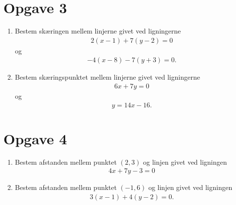 \section*{Opgave 3}
\begin{enumerate}[label=\roman*)]
	\item Bestem skæringen mellem linjerne givet ved ligningerne
	\begin{align*}
		2(x-1)+7(y-2) = 0
	\end{align*}
	og 
	\begin{align*}
		-4(x-8) -7(y+3) = 0.
	\end{align*}
	\item Bestem skæringspunktet mellem linjerne givet ved ligningerne
	\begin{align*}
		6x+7y=0
	\end{align*}
	og 
	\begin{align*}
		y = 14x-16.	
	\end{align*}
\end{enumerate}

\section*{Opgave 4}
\begin{enumerate}[label=\roman*)]
	\item Bestem afstanden mellem punktet $(2,3)$ og linjen givet ved ligningen
	\begin{align*}
		4x+7y-3=0
	\end{align*}
	\item Bestem afstanden mellem punktet $(-1,6)$ og linjen givet ved ligningen
	\begin{align*}
		3(x-1) + 4(y-2) = 0.
	\end{align*}
\end{enumerate}
